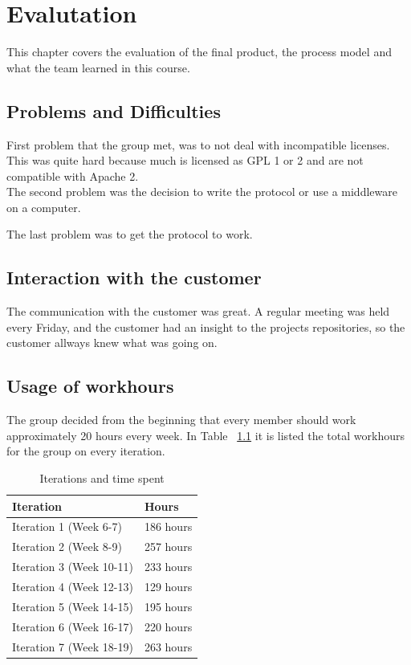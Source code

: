 \chapter{Evalutation}

This chapter covers the evaluation of the final product, the process model and what the team learned in this course.

\section{Problems and Difficulties}
	First problem that the group met, was to not deal with incompatible licenses. This was quite hard because much is licensed as GPL 1 or 2 and are not compatible with Apache 2. \\

	The second problem was the decision to write the protocol or use a middleware on a computer.

	The last problem was to get the protocol to work.

\section{Interaction with the customer}
	The communication with the customer was great. A regular meeting was held every Friday, and the customer had an insight to the projects repositories, so the customer allways knew what was going on. 

\section{Usage of workhours}
	The group decided from the beginning that every member should work approximately 20 hours every week.
	In Table ~\ref{table:workhours} it is listed the total workhours for the group on every iteration.

	\begin{table}[H]
	\caption{Iterations and time spent}
	\centering
	\label{table:workhours}
	\begin{tabular}{|l|l|}
		\hline
			{\bf Iteration} & {\bf Hours}\\
		\hline
			Iteration 1 (Week 6-7) & 186 hours\\
		\hline
			Iteration 2 (Week 8-9) & 257 hours\\
		\hline
			Iteration 3 (Week 10-11) & 233 hours\\
		\hline
			Iteration 4 (Week 12-13) & 129 hours\\
		\hline
			Iteration 5 (Week 14-15) & 195 hours\\
		\hline
			Iteration 6 (Week 16-17) & 220 hours\\
		\hline
			Iteration 7 (Week 18-19) & 263 hours\\
		\hline
	\end{tabular}
	\end{table}

